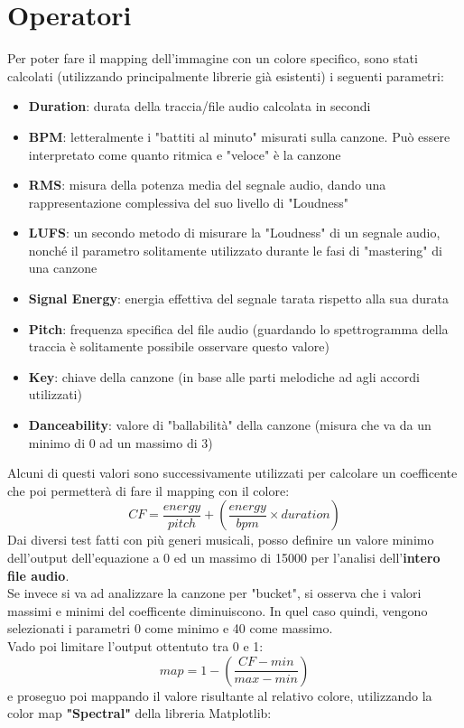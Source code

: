\documentclass{article}
\begin{document}
\section{Operatori}
\label{sec:operatori}
Per poter fare il mapping dell'immagine con un colore specifico, sono stati calcolati (utilizzando principalmente librerie già esistenti) i seguenti parametri:
\begin{itemize}
    \item \textbf{Duration}: durata della traccia/file audio calcolata in secondi
    \item \textbf{BPM}: letteralmente i "battiti al minuto" misurati sulla canzone. Può essere interpretato come quanto ritmica e "veloce" è la canzone
    \item \textbf{RMS}: misura della potenza media del segnale audio, dando una rappresentazione complessiva del suo livello di "Loudness"
    \item \textbf{LUFS}: un secondo metodo di misurare la "Loudness" di un segnale audio, nonché il parametro solitamente utilizzato durante le fasi di "mastering" di una canzone
    \item \textbf{Signal Energy}: energia effettiva del segnale tarata rispetto alla sua durata
    \item \textbf{Pitch}: frequenza specifica del file audio (guardando lo spettrogramma della traccia è solitamente possibile osservare questo valore)
    \item \textbf{Key}: chiave della canzone (in base alle parti melodiche ad agli accordi utilizzati)
    \item \textbf{Danceability}: valore di "ballabilità" della canzone (misura che va da un minimo di 0 ad un massimo di 3)
\end{itemize}

Alcuni di questi valori sono successivamente utilizzati per calcolare un
coefficente che poi permetterà di fare il mapping con il colore:
\[
    CF = \frac{energy}{pitch} + \left(\frac{energy}{bpm} \times duration\right)
\]
Dai diversi test fatti con più generi musicali, posso definire un valore minimo
dell'output dell'equazione a 0 ed un massimo di 15000 per l'analisi
dell'\textbf{intero file audio}.\\ Se invece si va ad analizzare la canzone per
"bucket", si osserva che i valori massimi e minimi del coefficente
diminuiscono. In quel caso quindi, vengono selezionati i parametri 0 come
minimo e 40 come massimo.\\ Vado poi limitare l'output ottentuto tra 0 e 1:
\[
    map = 1 - \left( \frac{CF - min}{max - min} \right)
\]
e proseguo poi mappando il valore risultante al relativo colore, utilizzando la
color map \textbf{"Spectral"} della libreria Matplotlib:
\end{document}
